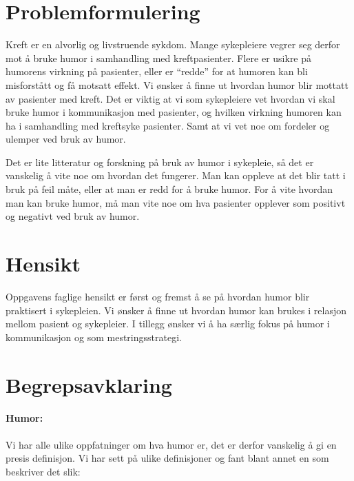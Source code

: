 \section{Problemformulering}

Kreft er en alvorlig og livstruende sykdom. Mange sykepleiere vegrer seg derfor
mot å bruke humor i samhandling med kreftpasienter. Flere er usikre på humorens
virkning på pasienter, eller er “redde” for at humoren kan bli misforstått og
få motsatt effekt. Vi ønsker å finne ut hvordan humor blir mottatt av pasienter
med kreft. Det er viktig at vi som sykepleiere vet hvordan vi skal bruke humor
i kommunikasjon med pasienter, og hvilken virkning humoren kan ha i samhandling
med kreftsyke pasienter. Samt at vi vet noe om fordeler og ulemper ved bruk av
humor.

Det er lite litteratur og forskning på bruk av humor i sykepleie, så det er
vanskelig å vite noe om hvordan det fungerer. Man kan oppleve at det blir tatt
i bruk på feil måte, eller at man er redd for å bruke humor. For å vite hvordan
man kan bruke humor, må man vite noe om hva pasienter opplever som positivt og
negativt ved bruk av humor.

\section{Hensikt}

Oppgavens faglige hensikt er først og fremst å se på hvordan humor blir
praktisert i sykepleien. Vi ønsker å finne ut hvordan humor kan brukes i
relasjon mellom pasient og sykepleier. I tillegg ønsker vi å ha særlig fokus på
humor i kommunikasjon og som mestringsstrategi.

\section{Begrepsavklaring}

\paragraph{Humor:} Vi har alle ulike oppfatninger om hva humor er, det er
derfor vanskelig å gi en presis definisjon. Vi har sett på ulike definisjoner
og fant blant annet en som beskriver det slik:


